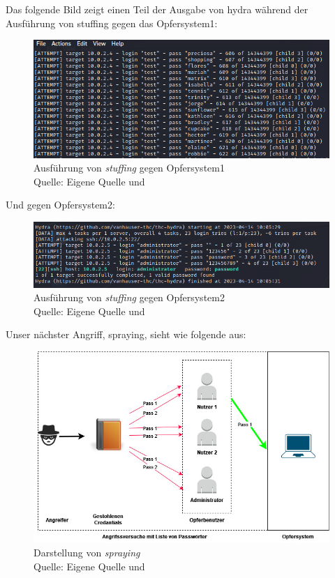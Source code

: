 Das folgende Bild zeigt einen Teil der Ausgabe von \gls{hydra} während der Ausführung von \gls{stuffing} gegen das Opfersystem1:
\begin{figure}[H]
   \centering
   \includegraphics[width=1\textwidth]{assets/stuffing_kali.png}
   \caption[Ausführung von \textit{\gls{stuffing}} gegen Opfersystem1]
   {Ausführung von \textit{\gls{stuffing}} gegen Opfersystem1\\Quelle: Eigene Quelle und \citep{Nguyen_stuffing}}
   \centering
\end{figure}

Und gegen Opfersystem2:
\begin{figure}[H]
   \centering
   \includegraphics[width=1\textwidth]{assets/stuffing_kali2.png}
   \caption[Ausführung von \textit{\gls{stuffing}} gegen Opfersystem2]
   {Ausführung von \textit{\gls{stuffing}} gegen Opfersystem2\\Quelle: Eigene Quelle und \citep{Nguyen_stuffing}}
   \centering
\end{figure}

\newpage
Unser nächster Angriff, \gls{spraying}, sieht wie folgende aus:
\begin{figure}[H]
   \centering
   \includegraphics[width=1\textwidth]{assets/Spraying.jpg}
   \caption[Darstellung von \textit{\gls{spraying}}]
   {Darstellung von \textit{\gls{spraying}}\\Quelle: Eigene Quelle und \citep{Swathi_spraxy}}
   \label{fig:spraying}
   \centering
\end{figure}


